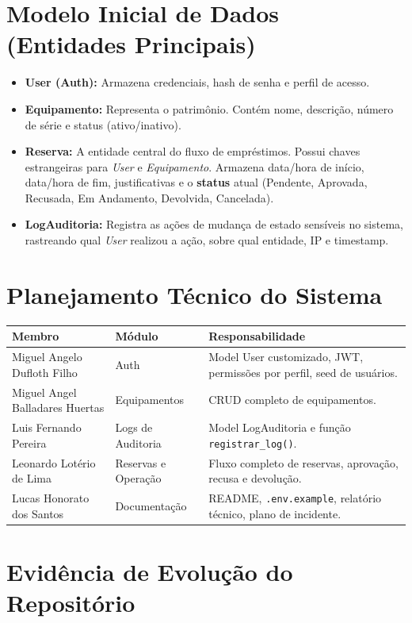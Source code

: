 \documentclass[12pt,a4paper]{article}
\begin{document}
\section*{Modelo Inicial de Dados (Entidades Principais)}

\begin{itemize}
    \item \textbf{User (Auth):} Armazena credenciais, hash de senha e perfil de acesso.
    \item \textbf{Equipamento:} Representa o patrimônio. Contém nome, descrição, número de série e status (ativo/inativo).
    \item \textbf{Reserva:} A entidade central do fluxo de empréstimos. Possui chaves estrangeiras para \textit{User} e \textit{Equipamento}. Armazena data/hora de início, data/hora de fim, justificativas e o \textbf{status} atual (Pendente, Aprovada, Recusada, Em Andamento, Devolvida, Cancelada).
    \item \textbf{LogAuditoria:} Registra as ações de mudança de estado sensíveis no sistema, rastreando qual \textit{User} realizou a ação, sobre qual entidade, IP e timestamp.
\end{itemize}

\section*{Planejamento Técnico do Sistema}

\begin{tabular}{@{}p{4.5cm}p{2.5cm}p{8cm}@{}}
\toprule
\textbf{Membro} & \textbf{Módulo} & \textbf{Responsabilidade} \\
\midrule
Miguel Angelo Dufloth Filho     & Auth                & Model User customizado, JWT, permissões por perfil, seed de usuários. \\
Miguel Angel Balladares Huertas & Equipamentos        & CRUD completo de equipamentos. \\
Luis Fernando Pereira           & Logs de Auditoria   & Model LogAuditoria e função \texttt{registrar\_log()}. \\
Leonardo Lotério de Lima        & Reservas e Operação & Fluxo completo de reservas, aprovação, recusa e devolução. \\
Lucas Honorato dos Santos       & Documentação        & README, \texttt{.env.example}, relatório técnico, plano de incidente. \\
\bottomrule
\end{tabular}

\section*{Evidência de Evolução do Repositório}
\end{document}
